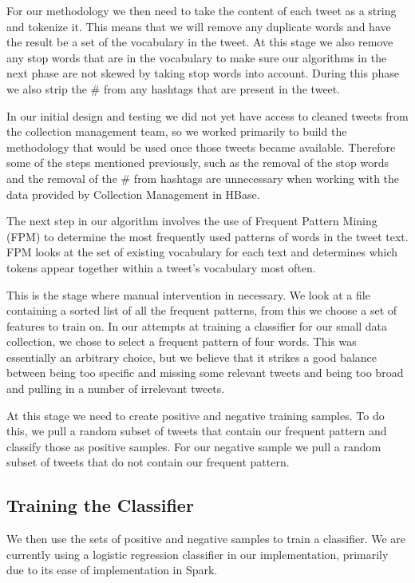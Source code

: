 For our methodology we then need to take the content of each tweet as a string and tokenize it. This means that we will remove any duplicate words and have the result be a set of the vocabulary in the tweet. At this stage we also remove any stop words that are in the vocabulary to make sure our algorithms in the next phase are not skewed by taking stop words into account. During this phase we also strip the \# from any hashtags that are present in the tweet.

In our initial design and testing we did not yet have access to cleaned tweets from the collection management team, so we worked primarily to build the methodology that would be used once those tweets became available. Therefore some of the steps mentioned previously, such as the removal of the stop words and the removal of the \# from hashtags are unnecessary when working with the data provided by Collection Management in HBase.

The next step in our algorithm involves the use of Frequent Pattern Mining (FPM) to determine the most frequently used patterns of words in the tweet text. FPM looks at the set of existing vocabulary for each text and determines which tokens appear together within a tweet's vocabulary most often.

This is the stage where manual intervention in necessary. We look at a file containing a sorted list of all the frequent patterns, from this we choose a set of features to train on. In our attempts at training a classifier for our small data collection, we chose to select a frequent pattern of four words. This was essentially an arbitrary choice, but we believe that it strikes a good balance between being too specific and missing some relevant tweets and being too broad and pulling in a number of irrelevant tweets.

At this stage we need to create positive and negative training samples. To do this, we pull a random subset of tweets that contain our frequent pattern and classify those as positive samples. For our negative sample we pull a random subset of tweets that do not contain our frequent pattern.

\subsection{Training the Classifier}

We then use the sets of positive and negative samples to train a classifier. We are currently using a logistic regression classifier in our implementation, primarily due to its ease of implementation in Spark.

